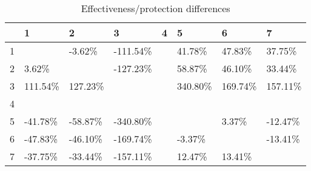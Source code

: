 \begin{table}[ht]
\centering
\begin{tabular}{rlllllll}
  \hline
 & 1 & 2 & 3 & 4 & 5 & 6 & 7 \\ 
  \hline
1 &  & -3.62\% & -111.54\% &  & 41.78\% & 47.83\% & 37.75\% \\ 
  2 & 3.62\% &  & -127.23\% &  & 58.87\% & 46.10\% & 33.44\% \\ 
  3 & 111.54\% & 127.23\% &  &  & 340.80\% & 169.74\% & 157.11\% \\ 
  4 &  &  &  &  &  &  &  \\ 
  5 & -41.78\% & -58.87\% & -340.80\% &  &  & 3.37\% & -12.47\% \\ 
  6 & -47.83\% & -46.10\% & -169.74\% &  & -3.37\% &  & -13.41\% \\ 
  7 & -37.75\% & -33.44\% & -157.11\% &  & 12.47\% & 13.41\% &  \\ 
   \hline
\end{tabular}
\caption{Effectiveness/protection differences} 
\end{table}
